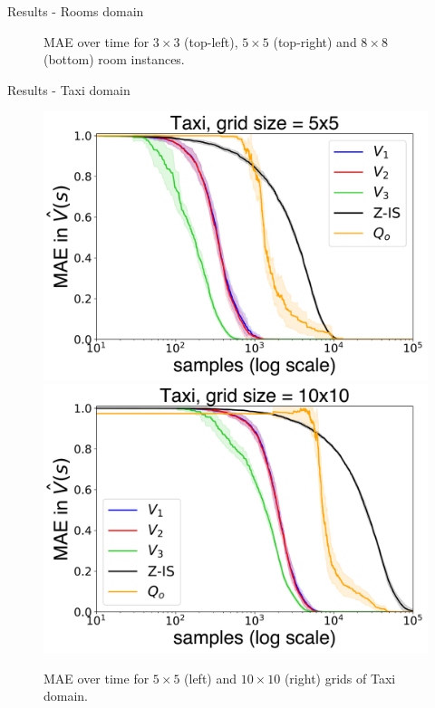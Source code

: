 \documentclass{beamer}
\theoremstyle{mystyle}
\begin{document}
\begin{frame}{Results - Rooms domain}
\begin{figure}[H]
        \caption{MAE over time for $3 \times 3$ (top-left), $5 \times 5$ (top-right) and $8 \times 8$ (bottom) room instances.}
        \label{fig:errors_grid}
    \end{figure}

\end{frame}


\begin{frame}{Results - Taxi domain}

    \begin{figure}[H]
        \centering
        \includegraphics[scale=0.22]{Figures/taxi_5-1.png}
        \includegraphics[scale=0.22]{Figures/taxi_10-1.png}
        \caption{MAE over time for $5 \times 5$ (left) and $10 \times 10$ (right) grids of Taxi domain.}
        \label{fig:errors_taxi}
    \end{figure}

\end{frame}
\end{document}

